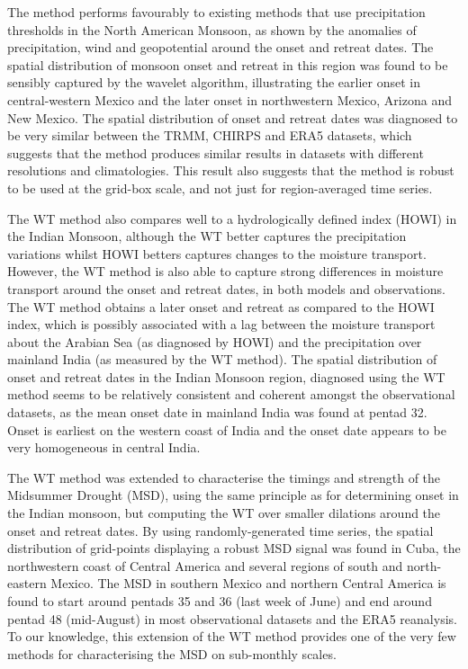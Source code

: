 The method performs favourably to existing methods that use precipitation thresholds in the North American Monsoon, as shown by the anomalies of precipitation, wind and geopotential around the onset and retreat dates. 
The spatial distribution of monsoon onset and retreat in this region was found to be sensibly captured by the wavelet algorithm, illustrating the earlier onset in central-western Mexico and the later onset in northwestern Mexico, Arizona and New Mexico. 
The spatial distribution of onset and retreat dates was diagnosed to be very similar between the TRMM, CHIRPS and ERA5 datasets, which suggests that the method produces similar results in datasets with different resolutions and climatologies. This result also suggests that the method is robust to be used at the grid-box scale, and not just for region-averaged time series.
 
The WT method also compares well to a hydrologically defined index (HOWI) in the Indian Monsoon, although the WT better captures the precipitation variations whilst HOWI betters captures changes to the moisture transport. However, the WT method is also able to capture strong differences in moisture transport around the onset and retreat dates, in both models and observations. The WT method obtains a later onset and retreat as compared to the HOWI index, which is possibly associated with a lag between the moisture transport about the Arabian Sea (as diagnosed by HOWI) and the precipitation over mainland India (as measured by the WT method). The spatial distribution of onset and retreat dates in the Indian Monsoon region, diagnosed using the WT method seems to be relatively consistent and coherent amongst the observational datasets, as the mean onset date in mainland India was found at pentad 32.
Onset is earliest on the western coast of India and the onset date appears to be very homogeneous in central India.

The WT method was extended to characterise the timings and strength of the Midsummer Drought (MSD), using the same principle as for determining onset in the Indian monsoon, but computing the WT over smaller dilations around the onset and retreat dates.  By using randomly-generated time series, the spatial distribution of grid-points displaying a robust MSD signal was found in Cuba, the northwestern coast of Central America and several regions of south and north-eastern Mexico.  The MSD in southern Mexico and northern Central America is found to start around pentads 35 and 36 (last week of June) and end around pentad 48 (mid-August) in most observational datasets and the ERA5 reanalysis. To our knowledge, this extension of the WT method provides one of the very few methods for characterising the MSD on sub-monthly scales.


